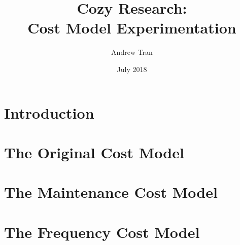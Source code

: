 \documentclass[12pt]{article}
\title{Cozy Research: \\ Cost Model Experimentation}
\author{Andrew Tran}
\date{July 2018}
\begin{document}
\maketitle

\section{Introduction}


\section{The Original Cost Model}


\section{The Maintenance Cost Model}


\section{The Frequency Cost Model}

\end{document}
